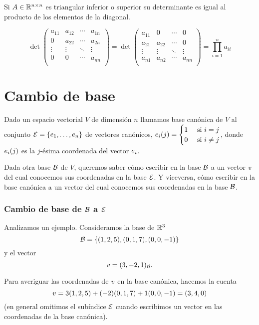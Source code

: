 Si $\Ab \in \R^{n \times n}$ es triangular inferior o superior su determinante es igual al producto de los elementos de la diagonal.

$$
\det\begin{pmatrix}a_{11}&a_{12}&\cdots & a_{1n} \\ 0 &a_{22}&\cdots & a_{2n}\\\vdots &\vdots &\ddots &\vdots \\0&0 & \cdots &a_{nn}\\\end{pmatrix} = \det\begin{pmatrix}a_{11}& 0&\cdots &0 \\ a_{21} &a_{22}&\cdots & 0\\\vdots &\vdots &\ddots &\vdots \\a_{n1}&a_{n2} & \cdots &a_{nn}\\\end{pmatrix} = \prod_{i=1}^n a_{ii}
$$




\section{Cambio de base}

Dado un espacio vectorial $V$ de dimensión $n$ llamamos base canónica de $V$ al conjunto $\E= \{\eb_1, \dots, \eb_n\}$ de vectores canónicos, $\eb_i(j) = \begin{cases} 1 & \text{ si } i = j \\ 0 & \text{ si } i \neq j \end{cases}$, donde $\eb_i(j)$ es la $j$-ésima coordenada del vector $\eb_i$.

Dada otra base $\mathcal B$ de $V$, queremos saber cómo escribir en la base $\mathcal B$ a un vector $\vb$ del cual conocemos sus coordenadas en la base $\mathcal E$. Y viceversa, cómo escribir en la base canónica a un vector del cual conocemos sus coordenadas en la base $\mathcal B$.

\subsubsection{Cambio de base de $\mathcal B$ a $\mathcal E$}

Analizamos un ejemplo. Consideramos la base de $\mathbb R^3$
$$\mathcal B= \{(1,2,5), (0, 1, 7), (0,0,-1)\}$$  y el vector
$$\vb = (3, -2, 1)_\B.$$

Para averiguar las coordenadas de $\vb$ en la base canónica, hacemos la cuenta
$$\vb = 3 (1,2,5) + (-2) (0, 1, 7) + 1 (0, 0, -1) = (3, 4, 0)$$
(en general omitimos el subíndice $\mathcal E$ cuando escribimos un vector en las coordenadas de la base canónica).

